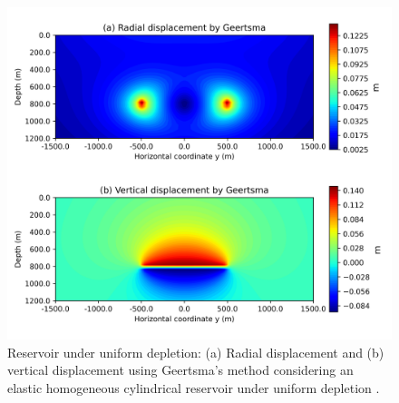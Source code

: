 \documentclass[P]{BrJG_submit}
\begin{document}
\begin{figure}[h]
    \centering
    \includegraphics[scale=0.40]{figures/Figure_Displacement_Geertsma.png}
    \caption{Reservoir under uniform depletion: (a) Radial displacement and (b) vertical displacement using 
    Geertsma’s method \citep{Geertsma73}  considering an elastic homogeneous cylindrical reservoir under 
    uniform depletion \citep{Fjaer08}.}
	\label{fig:displacement_Geertsma}
\end{figure} 
\end{document}
